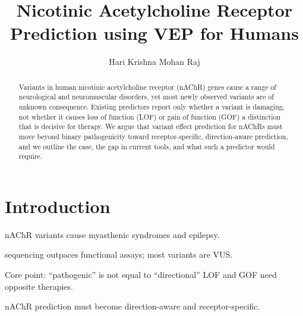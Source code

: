 \documentclass{ws-procs11x85}
\begin{document}
\title{Nicotinic Acetylcholine Receptor Prediction using VEP for Humans}

\author{Hari Krishna Mohan Raj}

\address{Department of Computational Chemistry,\\
Hochschule Bonn Rhein Sieg, Sankt Augustin, Germany\\
E-mail: harikrishnam0711@gmail.com}

\begin{abstract}
Variants in human nicotinic acetylcholine receptor (nAChR) genes cause
a range of neurological and neuromuscular disorders, yet most newly
observed variants are of unknown consequence. Existing predictors
report only whether a variant is damaging, not whether it causes
loss of function (LOF) or gain of function (GOF) a distinction that
is decisive for therapy. We argue that variant effect prediction for
nAChRs must move beyond binary pathogenicity toward receptor-specific,
direction-aware prediction, and we outline the case, the gap in
current tools, and what such a predictor would require.
\end{abstract}



\section{Introduction}\label{sec:intro}
\begin{itemlist}
\item nAChR variants cause myasthenic syndromes and epilepsy.
\item sequencing outpaces functional assays; most variants are VUS.
\item Core point: ``pathogenic'' is not equal to ``directional'' LOF and GOF need opposite therapies.
\item nAChR prediction must become direction-aware and receptor-specific.
\end{itemlist}
\end{document}

